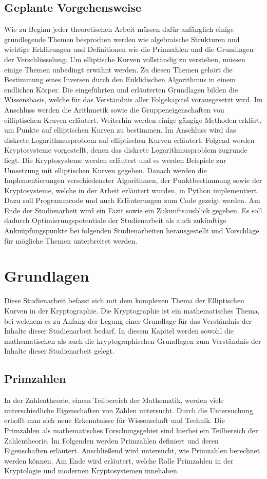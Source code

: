\section{Geplante Vorgehensweise}
Wie zu Beginn jeder theoretischen Arbeit müssen dafür anfänglich einige grundlegende Themen besprochen werden wie algebraische Strukturen und wichtige Erklärungen und Definitionen wie die Primzahlen und die Grundlagen der Verschlüsselung. Um elliptische Kurven vollständig zu verstehen, müssen einige Themen unbedingt erwähnt werden. Zu diesen Themen gehört die Bestimmung eines Inversen durch den Euklidischen Algorithmus in einem endlichen Körper. Die eingeführten und erläuterten Grundlagen bilden die Wissensbasis, welche für das Verständnis aller Folgekapitel vorausgesetzt wird. Im Anschluss werden die Arithmetik sowie die Gruppeneigenschaften von eilliptischen Kruven erläutert. Weiterhin werden einige gängige Methoden erklärt, um Punkte auf elliptischen Kurven zu bestimmen. Im Anschluss wird das diskrete Logarithmusproblem auf elliptischen Kurven erläutert. Folgend werden Kryptosysteme vorgestellt, denen das diskrete Logarithmusproblem zugrunde liegt. Die Kryptosysteme werden erläutert und es werden Beispiele zur Umsetzung mit elliptischen Kurven gegeben. Danach werden die Implementierungen verschiedenster Algorithmen, der Punktbestimmung sowie der Kryptosysteme, welche in der Arbeit erläutert wurden, in Python implementiert. Dazu soll Programmcode und auch Erläuterungen zum Code gezeigt werden. Am Ende der Studienarbeit wird ein Fazit sowie ein Zukunftsausblick gegeben. Es soll dadurch Optimierungspotentiale der Studienarbeit als auch zukünftige Anknüpfungspunkte bei folgenden Studienarbeiten herausgestellt und Vorschläge für mögliche Themen unterbreitet werden.

\chapter{Grundlagen}\label{sec:grundlagen}
Diese Studienarbeit befasst sich mit dem komplexen Thema der Elliptischen Kurven in der Kryptographie. Die Kryptographie ist ein mathematisches Thema, bei welchem es zu Anfang der Legung einer Grundlage für das Verständnis der Inhalte dieser Studienarbeit bedarf. In diesem Kapitel werden sowohl die mathematischen als auch die kryptographischen Grundlagen zum Verständnis der Inhalte dieser Studienarbeit gelegt.

\section{Primzahlen}
In der Zahlentheorie, einem Teilbereich der Mathematik, werden viele unterschiedliche Eigenschaften von Zahlen untersucht. Durch die Untersuchung erhofft man sich neue Erkenntnisse für Wissenschaft und Technik. Die Primzahlen als mathematisches Forschungsgebiet sind hierbei ein Teilbereich der Zahlentheorie. Im Folgenden werden Primzahlen definiert und deren Eigenschaften erläutert. Anschließend wird untersucht, wie Primzahlen berechnet werden können. Am Ende wird erläutert, welche Rolle Primzahlen in der Kryptologie und modernen Kryptosystemen innehaben.

